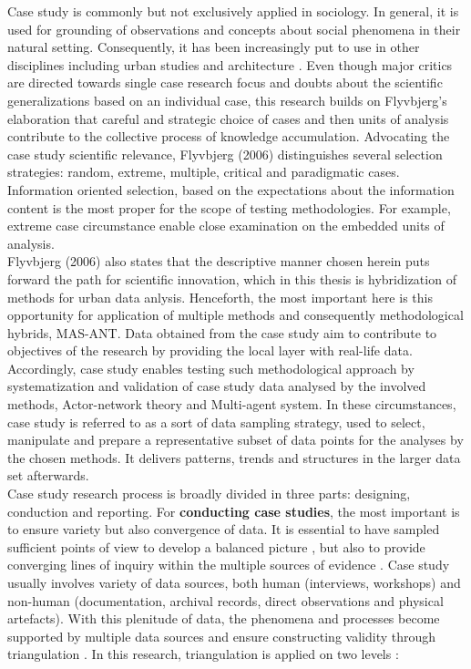 \documentclass[11pt]{report}
\begin{document}
Case study is commonly but not exclusively applied in sociology. In general, it is used for grounding of observations and concepts about social phenomena in their natural setting. Consequently, it has been increasingly put to use in other disciplines including urban studies and architecture . Even though major critics are directed towards single case research focus and doubts about the scientific generalizations based on an individual case, this research builds on Flyvbjerg's elaboration  that careful and strategic choice of cases and then units of analysis contribute to the collective process of knowledge accumulation. Advocating the case study scientific relevance, Flyvbjerg (2006) distinguishes several selection strategies: random, extreme, multiple, critical and paradigmatic cases. Information oriented selection, based on the expectations about the information content is the most proper for the scope of testing methodologies. For example, extreme case circumstance enable close examination on the embedded units of analysis.
\\
Flyvbjerg (2006) also states that the descriptive manner chosen herein puts forward the path for scientific innovation, which in this thesis is hybridization of methods for urban data anlysis. Henceforth, the most important here is this opportunity for application of multiple methods  and consequently methodological hybrids, MAS-ANT. Data obtained from the case study aim to contribute to objectives of the research by providing the local layer with real-life data. Accordingly, case study enables testing such methodological approach by systematization and validation of case study data analysed by the involved methods, Actor-network theory and Multi-agent system. In these circumstances, case study is referred to as a sort of data sampling strategy, used to select, manipulate and prepare a representative subset of data points for the analyses by the chosen methods. It delivers patterns, trends and structures in the larger data set afterwards.
\\
Case study research process is broadly divided in three parts: designing, conduction and reporting. For \textbf{conducting case studies}, the most important is to ensure variety but also convergence of data. It is essential to have  sampled  sufficient  points  of  view  to  develop  a balanced picture , but also to provide converging lines of inquiry within the multiple sources of evidence . Case study usually involves  variety of data sources, both human (interviews, workshops) and non-human (documentation, archival records, direct observations and physical artefacts). With this plenitude of data, the phenomena and processes become supported by multiple data sources and ensure constructing validity through triangulation . In this research, triangulation is applied on two levels :
\end{document}
